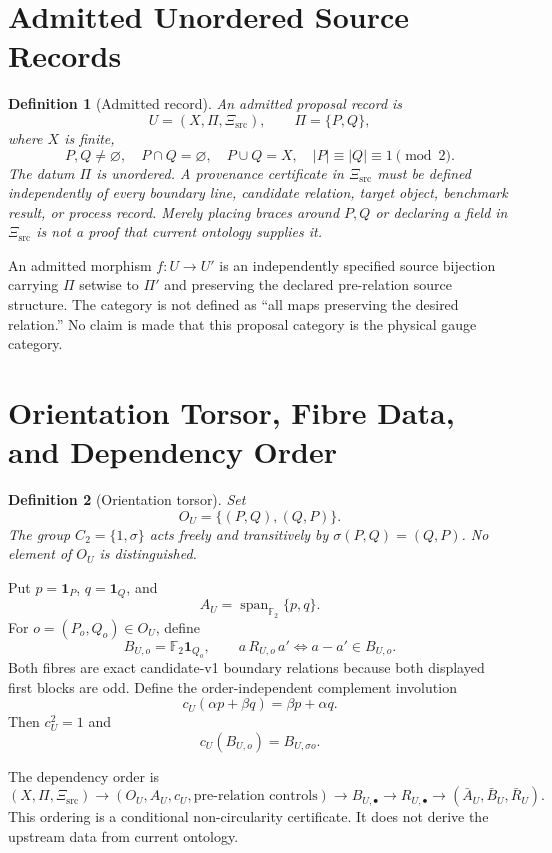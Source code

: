 \documentclass[11pt]{article}
\newtheorem{definition}{Definition}
\newcommand{\Ftwo}{\mathbb F_2}
\begin{document}
\section{Admitted Unordered Source Records}

\begin{definition}[Admitted record]
An admitted proposal record is
\[
 U=(X,\Pi,\Xi_{\mathrm{src}}),\qquad \Pi=\{P,Q\},
\]
where \(X\) is finite,
\[
 P,Q\neq\varnothing,\quad P\cap Q=\varnothing,\quad P\cup Q=X,\quad
 |P|\equiv|Q|\equiv1\pmod2.
\]
The datum \(\Pi\) is unordered. A provenance certificate in
\(\Xi_{\mathrm{src}}\) must be defined independently of every boundary line,
candidate relation, target object, benchmark result, or process record.
Merely placing braces around \(P,Q\) or declaring a field in
\(\Xi_{\mathrm{src}}\) is not a proof that current ontology supplies it.
\end{definition}

An admitted morphism \(f:U\to U'\) is an independently specified source
bijection carrying \(\Pi\) setwise to \(\Pi'\) and preserving the declared
pre-relation source structure. The category is not defined as ``all maps
preserving the desired relation.'' No claim is made that this proposal
category is the physical gauge category.

\section{Orientation Torsor, Fibre Data, and Dependency Order}

\begin{definition}[Orientation torsor]
Set
\[
 O_U=\{(P,Q),(Q,P)\}.
\]
The group \(C_2=\{1,\sigma\}\) acts freely and transitively by
\(\sigma(P,Q)=(Q,P)\). No element of \(O_U\) is distinguished.
\end{definition}

Put \(p=\mathbf1_P\), \(q=\mathbf1_Q\), and
\[
 A_U=\operatorname{span}_{\Ftwo}\{p,q\}.
\]
For \(o=(P_o,Q_o)\in O_U\), define
\[
 B_{U,o}=\Ftwo\mathbf1_{Q_o},\qquad
 a\,R_{U,o}\,a'\Longleftrightarrow a-a'\in B_{U,o}.
\]
Both fibres are exact candidate-v1 boundary relations because both displayed
first blocks are odd. Define the order-independent complement involution
\[
 c_U(\alpha p+\beta q)=\beta p+\alpha q.
\]
Then \(c_U^2=1\) and
\[
 c_U(B_{U,o})=B_{U,\sigma o}.
\]

The dependency order is
\[
(X,\Pi,\Xi_{\mathrm{src}})
\longrightarrow(O_U,A_U,c_U,\text{pre-relation controls})
\longrightarrow B_{U,\bullet}
\longrightarrow R_{U,\bullet}
\longrightarrow(\bar A_U,\bar B_U,\bar R_U).
\]
This ordering is a conditional non-circularity certificate. It does not
derive the upstream data from current ontology.
\end{document}
